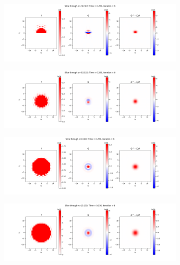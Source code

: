 \documentclass{article}
\begin{document}
\begin{figure}[H]
  \begin{subfigure}[b]{\textwidth}
    \includegraphics[width=\textwidth]{imgs/lf_output2/slice0/mat6.png}
  \end{subfigure}
  \hfill
  \begin{subfigure}[b]{\textwidth}
    \includegraphics[width=\textwidth]{imgs/lf_output2/slice25/mat6.png}
  \end{subfigure}
  \hfill
  \begin{subfigure}[b]{\textwidth}
    \includegraphics[width=\textwidth]{imgs/lf_output2/slice50/mat6.png}
  \end{subfigure}
  \hfill
  \begin{subfigure}[b]{\textwidth}
    \includegraphics[width=\textwidth]{imgs/lf_output2/slice75/mat6.png}
  \end{subfigure}
\end{figure}
\end{document}
